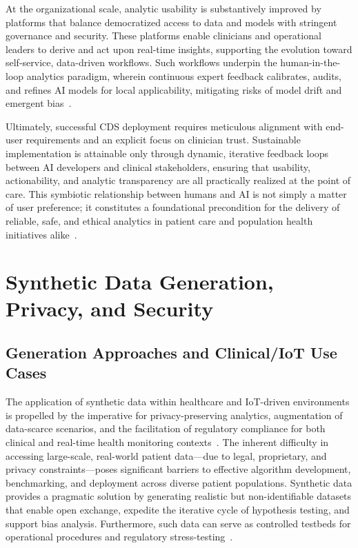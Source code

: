\documentclass[sigconf]{acmart}
\begin{document}
At the organizational scale, analytic usability is substantively improved by platforms that balance democratized access to data and models with stringent governance and security. These platforms enable clinicians and operational leaders to derive and act upon real-time insights, supporting the evolution toward self-service, data-driven workflows. Such workflows underpin the human-in-the-loop analytics paradigm, wherein continuous expert feedback calibrates, audits, and refines AI models for local applicability, mitigating risks of model drift and emergent bias~\cite{ref84,ref106}.

Ultimately, successful CDS deployment requires meticulous alignment with end-user requirements and an explicit focus on clinician trust. Sustainable implementation is attainable only through dynamic, iterative feedback loops between AI developers and clinical stakeholders, ensuring that usability, actionability, and analytic transparency are all practically realized at the point of care. This symbiotic relationship between humans and AI is not simply a matter of user preference; it constitutes a foundational precondition for the delivery of reliable, safe, and ethical analytics in patient care and population health initiatives alike~\cite{ref87,ref99,ref106}.

\section{Synthetic Data Generation, Privacy, and Security}

\subsection{Generation Approaches and Clinical/IoT Use Cases}

The application of synthetic data within healthcare and IoT-driven environments is propelled by the imperative for privacy-preserving analytics, augmentation of data-scarce scenarios, and the facilitation of regulatory compliance for both clinical and real-time health monitoring contexts~\cite{ref91,ref106}. The inherent difficulty in accessing large-scale, real-world patient data—due to legal, proprietary, and privacy constraints—poses significant barriers to effective algorithm development, benchmarking, and deployment across diverse patient populations. Synthetic data provides a pragmatic solution by generating realistic but non-identifiable datasets that enable open exchange, expedite the iterative cycle of hypothesis testing, and support bias analysis. Furthermore, such data can serve as controlled testbeds for operational procedures and regulatory stress-testing~\cite{ref91,ref106}.
\end{document}
